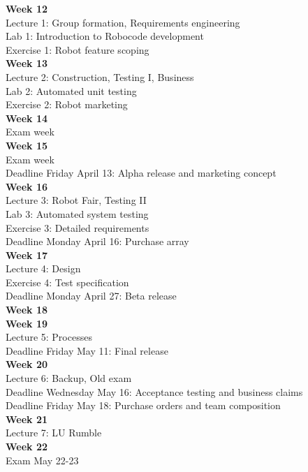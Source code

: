 \documentclass{scrreprt}
\begin{document}
\textbf{Week 12}\\Lecture 1: Group formation, Requirements engineering\\
Lab 1: Introduction to Robocode development\\
Exercise 1: Robot feature scoping\\
\textbf{Week 13}\\Lecture 2: Construction, Testing I, Business\\
Lab 2: Automated unit testing\\
Exercise 2: Robot marketing\\
\textbf{Week 14}\\Exam week\\
\textbf{Week 15}\\Exam week\\
Deadline Friday April 13: Alpha release and marketing concept\\
\textbf{Week 16}\\
Lecture 3: Robot Fair, Testing II\\
Lab 3: Automated system testing\\
Exercise 3: Detailed requirements\\
Deadline Monday April 16: Purchase array\\
\textbf{Week 17}\\
Lecture 4: Design\\
Exercise 4: Test specification\\
Deadline Monday April 27: Beta release\\
\textbf{Week 18}\\
\textbf{Week 19}\\
Lecture 5: Processes\\
Deadline Friday May 11: Final release\\
\textbf{Week 20}\\
Lecture 6: Backup, Old exam\\
Deadline Wednesday May 16: Acceptance testing and business claims\\
Deadline Friday May 18: Purchase orders and team composition\\
\textbf{Week 21}\\
Lecture 7: LU Rumble\\
\textbf{Week 22}\\
Exam May 22-23
\end{document}
